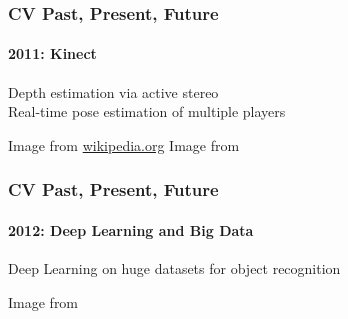 \documentclass[xetex,professionalfont]{beamer}
\begin{document}
\begin{frame}
\frametitle{CV Past, Present, Future}
\framesubtitle{2011: Kinect}

Depth estimation via active stereo\\\medskip
Real-time pose estimation of multiple players

\bigskip
\begin{center}
    {\centering Image from \url{wikipedia.org}}
    \qquad
    {\centering Image from \cite{shotton2011}}
\end{center}

\end{frame}


\begin{frame}
\frametitle{CV Past, Present, Future}
\framesubtitle{2012: Deep Learning and Big Data}

Deep Learning on huge datasets for object recognition

\bigskip
\begin{center}
    {\centering Image from \cite{bengio2015}}
\end{center}

\end{frame}

\end{document}
